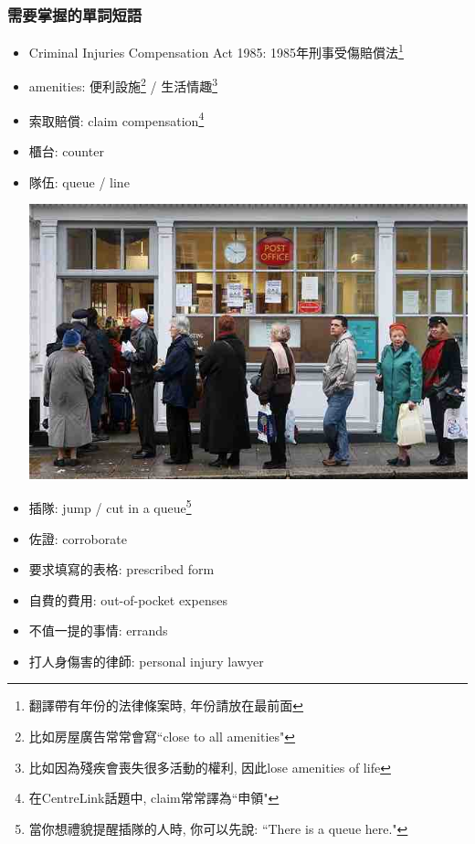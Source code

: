 \subsubsection*{需要掌握的單詞短語}
\begin{multicols}{2}
\begin{itemize}
  \itemsep0em
  \item Criminal Injuries Compensation Act 1985: 1985年刑事受傷賠償法\footnote{翻譯帶有年份的法律條案時, 年份請放在最前面}
  \item amenities: 便利設施\footnote{比如房屋廣告常常會寫``close to all amenities"} / 生活情趣\footnote{比如因為殘疾會喪失很多活動的權利, 因此lose amenities of life}
  \item 索取賠償: claim compensation\footnote{在CentreLink話題中, claim常常譯為``申領"}
  \item 櫃台: counter
  \item 隊伍: queue / line
  \begin{center}
  	\includegraphics[scale=.38]{pics/queue}
  \end{center}
  \item 插隊: jump / cut in a queue\footnote{當你想禮貌提醒插隊的人時, 你可以先說: ``There is a queue here."}
  \item 佐證: corroborate
  \item 要求填寫的表格: prescribed form
  \item 自費的費用: out-of-pocket expenses
  \item 不值一提的事情: errands
  \item 打人身傷害的律師: personal injury lawyer
\end{itemize}
\end{multicols}

